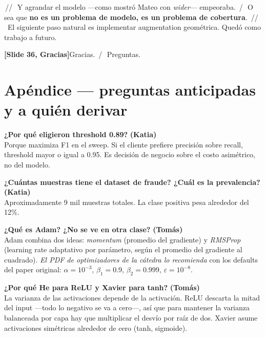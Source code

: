 \documentclass[11pt,a4paper]{article}
\newcommand{\slidenum}[1]{\textcolor{accent}{\textbf{[Slide #1]}}}
\newcommand{\enunciado}[1]{\textcolor{warn}{\textit{#1}}}
\newcommand{\pausa}{\textcolor{muted}{\,/\,}}
\newcommand{\Pausa}{\textcolor{muted}{\,/\!/\,}}
\begin{document}
\Pausa\ Y agrandar el modelo ---como mostró Mateo con \emph{wider}--- empeoraba. \pausa\ O sea que \textbf{no es un problema de modelo, es un problema de cobertura}. \Pausa\ El siguiente paso natural es implementar augmentation geométrica. Quedó como trabajo a futuro.

\slidenum{36, Gracias}\quad Gracias. \pausa\ Preguntas.

\section*{Apéndice — preguntas anticipadas y a quién derivar}

\begin{cue}
\textbf{¿Por qué eligieron threshold 0.89?} \textbf{(Katia)}\\
Porque maximiza F1 en el sweep. Si el cliente prefiere precisión sobre recall, threshold mayor o igual a 0.95. Es decisión de negocio sobre el costo asimétrico, no del modelo.
\end{cue}

\begin{cue}
\textbf{¿Cuántas muestras tiene el dataset de fraude? ¿Cuál es la prevalencia?} \textbf{(Katia)}\\
Aproximadamente 9 mil muestras totales. La clase positiva pesa alrededor del 12\%.
\end{cue}

\begin{cue}
\textbf{¿Qué es Adam? ¿No se ve en otra clase?} \textbf{(Tomás)}\\
Adam combina dos ideas: \emph{momentum} (promedio del gradiente) y \emph{RMSProp} (learning rate adaptativo por parámetro, según el promedio del gradiente al cuadrado). \enunciado{El PDF de optimizadores de la cátedra lo recomienda} con los defaults del paper original: $\alpha = 10^{-3}$, $\beta_1 = 0.9$, $\beta_2 = 0.999$, $\varepsilon = 10^{-8}$.
\end{cue}

\begin{cue}
\textbf{¿Por qué He para ReLU y Xavier para tanh?} \textbf{(Tomás)}\\
La varianza de las activaciones depende de la activación. ReLU descarta la mitad del input ---todo lo negativo se va a cero---, así que para mantener la varianza balanceada por capa hay que multiplicar el desvío por raíz de dos. Xavier asume activaciones simétricas alrededor de cero (tanh, sigmoide).
\end{cue}
\end{document}

